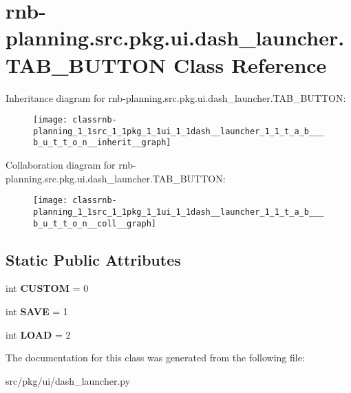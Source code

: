 \hypertarget{classrnb-planning_1_1src_1_1pkg_1_1ui_1_1dash__launcher_1_1_t_a_b___b_u_t_t_o_n}{}\section{rnb-\/planning.src.\+pkg.\+ui.\+dash\+\_\+launcher.\+T\+A\+B\+\_\+\+B\+U\+T\+T\+ON Class Reference}
\label{classrnb-planning_1_1src_1_1pkg_1_1ui_1_1dash__launcher_1_1_t_a_b___b_u_t_t_o_n}


Inheritance diagram for rnb-\/planning.src.\+pkg.\+ui.\+dash\+\_\+launcher.\+T\+A\+B\+\_\+\+B\+U\+T\+T\+ON\+:\nopagebreak
\begin{figure}[H]
\begin{center}
\leavevmode
\texttt{[image: classrnb-planning\_1\_1src\_1\_1pkg\_1\_1ui\_1\_1dash\_\_launcher\_1\_1\_t\_a\_b\_\_\_b\_u\_t\_t\_o\_n\_\_inherit\_\_graph]}
\end{center}
\end{figure}


Collaboration diagram for rnb-\/planning.src.\+pkg.\+ui.\+dash\+\_\+launcher.\+T\+A\+B\+\_\+\+B\+U\+T\+T\+ON\+:\nopagebreak
\begin{figure}[H]
\begin{center}
\leavevmode
\texttt{[image: classrnb-planning\_1\_1src\_1\_1pkg\_1\_1ui\_1\_1dash\_\_launcher\_1\_1\_t\_a\_b\_\_\_b\_u\_t\_t\_o\_n\_\_coll\_\_graph]}
\end{center}
\end{figure}
\subsection*{Static Public Attributes}
\begin{DoxyCompactItemize}
\item 
\mbox{\label{classrnb-planning_1_1src_1_1pkg_1_1ui_1_1dash__launcher_1_1_t_a_b___b_u_t_t_o_n_a4889ff9630112b8357b353602e4c5059}} 
int {\bfseries C\+U\+S\+T\+OM} = 0
\item 
\mbox{\label{classrnb-planning_1_1src_1_1pkg_1_1ui_1_1dash__launcher_1_1_t_a_b___b_u_t_t_o_n_a8ea89621dfd606252326e1beff31adaa}} 
int {\bfseries S\+A\+VE} = 1
\item 
\mbox{\label{classrnb-planning_1_1src_1_1pkg_1_1ui_1_1dash__launcher_1_1_t_a_b___b_u_t_t_o_n_a62c823a9bd4ec7a004a624658b29d9f2}} 
int {\bfseries L\+O\+AD} = 2
\end{DoxyCompactItemize}


The documentation for this class was generated from the following file\+:\begin{DoxyCompactItemize}
\item 
src/pkg/ui/dash\+\_\+launcher.\+py\end{DoxyCompactItemize}
